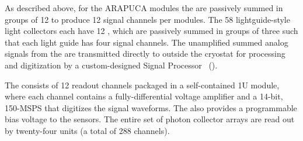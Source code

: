 
As described above, for the ARAPUCA modules the  are passively summed in groups of 12 to produce 12 signal channels per modules. The 58 lightguide-style light collectors each have 12 , which are passively summed in groups of three such that each light guide has four signal channels. 
The unamplified summed analog signals from the  are transmitted directly to outside the cryostat for processing and digitization by a custom-designed  Signal Processor~ ().

The  consists of 12 readout channels packaged in  a self-contained 1U module, where each channel contains a fully-differential voltage amplifier and a \num{14}-bit, \num{150}-MSPS  that digitizes the  signal waveforms. The  also provides a programmable bias voltage to the sensors.
The entire set of photon collector arrays are read out by twenty-four  units (a total of 288 channels).


